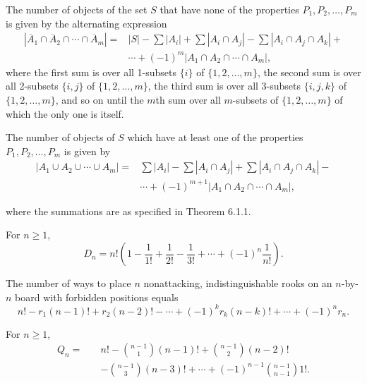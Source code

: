 \begin{theorem}
    \label{thm:6.1.1}
The number of objects of the set $S$ that have none of the properties $P_1, P_2, \ldots, P_m$ is given by the alternating expression
\begin{align*}
    |\overline{A}_1 \cap \overline{A}_2 \cap \cdots \cap \overline{A}_m| 
    = & |S| - \sum |A_i| + \sum |A_i \cap A_j| - \sum |A_i \cap A_j \cap A_k| + \\ 
    & \cdots + (-1)^m |A_1 \cap A_2 \cap \cdots \cap A_m|, \tag{6.2}
\end{align*}
where the first sum is over all 1-subsets $\{i\}$ of $\{1,2,\ldots,m\}$, the second sum is over all 2-subsets $\{i,j\}$ of $\{1,2,\ldots,m\}$, the third sum is over all 3-subsets $\{i,j,k\}$ of $\{1,2,\ldots,m\}$, and so on until the $m$th sum over all $m$-subsets of $\{1,2,\ldots,m\}$ of which the only one is itself.
\end{theorem} 


\begin{corollary}
    \label{cor:6.1.2}
The number of objects of $S$ which have at least one of the properties $P_1, P_2, \ldots, P_m$ is given by
\begin{align*}
    |A_1 \cup A_2 \cup \cdots \cup A_m| 
    = & \sum |A_i| - \sum |A_i \cap A_j| + \sum |A_i \cap A_j \cap A_k| - \\
    & \cdots + (-1)^{m+1} |A_1 \cap A_2 \cap \cdots \cap A_m|,
\tag{6.3}
\end{align*}

where the summations are as specified in Theorem 6.1.1.
\end{corollary}

\begin{theorem}
    \label{thm:6.3.1}
For $n \geq 1$,
\[
D_n = n! \left( 1 - \frac{1}{1!} + \frac{1}{2!} - \frac{1}{3!} + \cdots + (-1)^n \frac{1}{n!} \right).
\]
\end{theorem}

\begin{theorem}
    \label{thm:6.4.1}
The number of ways to place $n$ nonattacking, indistinguishable rooks on an $n$-by-$n$ board with forbidden positions equals
\[
n! - r_1 (n-1)! + r_2 (n-2)! - \cdots + (-1)^k r_k (n-k)! + \cdots + (-1)^n r_n.
\]
\end{theorem}

\begin{theorem}
    \label{thm:6.5.1}
For $n \geq 1$,
\begin{align*}
    Q_n = \quad & n! - \binom{n-1}{1}(n-1)! + \binom{n-1}{2}(n-2)! \\
    & - \binom{n-1}{3}(n-3)! + \cdots + (-1)^{n-1} \binom{n-1}{n-1}1!.
\end{align*}

\end{theorem}

